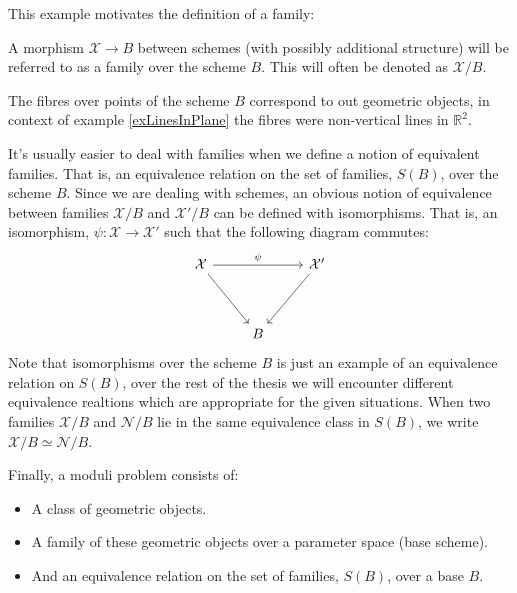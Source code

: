 This example motivates the definition of a family: 
\begin{definition}
    A morphism $\mathcal{X} \to B$ between schemes (with possibly additional structure) will be referred to as a family over the scheme $B$. This will often be denoted as $\mathcal{X}/B$.
\end{definition}
The fibres over points of the scheme $B$ correspond to out geometric objects, in context of example \ref{exLinesInPlane} the fibres were non-vertical lines in $\mathbb{R}^{2}$.
\par It's usually easier to deal with families when we define a notion of equivalent families. 
That is, an equivalence relation on the set of families, $S(B)$, over the scheme $B$. 
Since we are dealing with schemes, an obvious notion of equivalence between families $\mathcal{X}/B$ and $\mathcal{X}'/B$ can be defined with isomorphisms. That is, an isomorphism, $\psi: \mathcal{X} \to \mathcal{X}'$ such that the following diagram commutes:
\[
\begin{tikzcd}
    {\mathcal{X}} && {\mathcal{X}'}\\
    \\
                  & {B} 
     \arrow["\psi", from = 1-1, to = 1-3]
     \arrow[from = 1-1, to = 3-2]
     \arrow[from = 1-3, to = 3-2]
\end{tikzcd}
\]
Note that isomorphisms over the scheme $B$ is just an example of an equivalence relation on $S(B)$, over the rest of the thesis we will encounter different equivalence realtions which are appropriate for the given situations.
When two families $\mathcal{X}/B$ and $\mathcal{N}/B$ lie in the same equivalence class in $S(B)$, we write $\mathcal{X}/B \simeq \mathcal{N}/B$.
\par Finally, a moduli problem consists of:
\begin{itemize}
    \item A class of geometric objects.
    \item A family of these geometric objects over a parameter space (base scheme).
    \item And an equivalence relation on the set of families, $S(B)$, over a base $B$.
\end{itemize}


